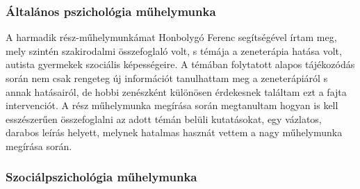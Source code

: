 \subsubsection*{Általános pszichológia műhelymunka}

\par A harmadik rész-műhelymunkámat Honbolygó Ferenc segítségével írtam meg, mely szin\-tén szakirodalmi összefoglaló volt, s témája a zeneterápia hatása volt, autista gyermekek szociális képességeire. A témában folytatott alapos tájékozódás során nem csak rengeteg új információt tanulhattam meg a zeneterápiáról s annak hatásairól, de hobbi zenészként különösen érdekesnek találtam ezt a fajta intervenciót. A rész műhelymunka megírása során megtanultam hogyan is kell esszészerűen összefoglalni az adott témán belüli kutatásokat, egy vázlatos, darabos leírás helyett, melynek hatalmas hasznát vettem a nagy műhelymunka megírása során.

\subsubsection*{Szociálpszichológia műhelymunka}

